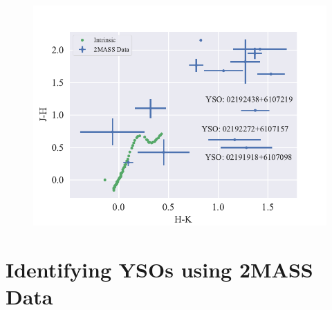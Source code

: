\documentclass[]{article}
\begin{document}
\begin{figure}[H]
	\centering
	\includegraphics[]{figs/intrinsic.pdf}
	\label{fig:intrin}
\end{figure}

\section{Identifying YSOs using 2MASS Data}
\end{document}
